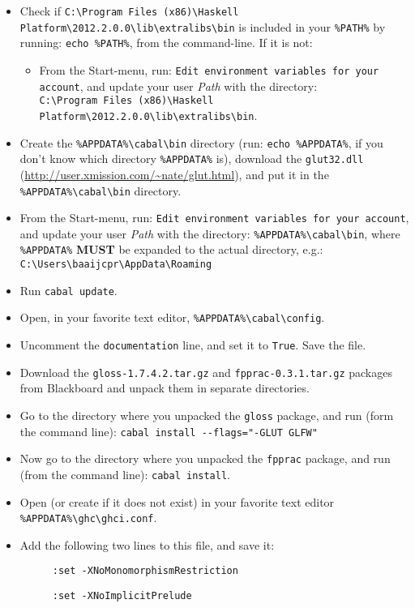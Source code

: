 \documentclass[]{article}
\begin{document}
\begin{itemize}
  \item Check if \texttt{C:\textbackslash{}Program Files (x86)\textbackslash{}Haskell Platform\textbackslash{}2012.2.0.0\textbackslash{}lib\textbackslash{}extralibs\textbackslash{}bin} is included in your \texttt{\%PATH\%} by running: \texttt{echo \%PATH\%}, from the command-line.
  If it is not:
  \begin{itemize}
    \item From the Start-menu, run: \texttt{Edit environment variables for your account}, and update your user \emph{Path} with the directory:\\ \texttt{C:\textbackslash{}Program Files (x86)\textbackslash{}Haskell Platform\textbackslash{}2012.2.0.0\textbackslash{}lib\textbackslash{}extralibs\textbackslash{}bin}.
  \end{itemize}
  \item Create the \texttt{\%APPDATA\%\textbackslash{}cabal\textbackslash{}bin} directory (run: \texttt{echo \%APPDATA\%}, if you don't know which directory \texttt{\%APPDATA\%} is), download the \texttt{glut32.dll} (\url{http://user.xmission.com/~nate/glut.html}), and put it in the \texttt{\%APPDATA\%\textbackslash{}cabal\textbackslash{}bin} directory.
  \item From the Start-menu, run: \texttt{Edit environment variables for your account}, and update your user \emph{Path} with the directory: \texttt{\%APPDATA\%\textbackslash{}cabal\textbackslash{}bin}, where \texttt{\%APPDATA\%} \textbf{MUST} be expanded to the actual directory, e.g.: \texttt{C:\textbackslash{}Users\textbackslash{}baaijcpr\textbackslash{}AppData\textbackslash{}Roaming}
  \item Run \texttt{cabal update}.
  \item Open, in your favorite text editor, \texttt{\%APPDATA\%\textbackslash{}cabal\textbackslash{}config}.
  \item Uncomment the \texttt{documentation} line, and set it to \texttt{True}. Save the file.
  \item Download the \texttt{gloss-1.7.4.2.tar.gz} and \texttt{fpprac-0.3.1.tar.gz} packages from Blackboard and unpack them in separate directories.
  \item Go to the directory where you unpacked the \texttt{gloss} package, and run (form the command line): \texttt{cabal install -{}-flags="-GLUT GLFW"}
  \item Now go to the directory where you unpacked the \texttt{fpprac} package, and run (from the command line): \texttt{cabal install}.
  \item Open (or create if it does not exist) in your favorite text editor \texttt{\%APPDATA\%\textbackslash{}ghc\textbackslash{}ghci.conf}.
  \item Add the following two lines to this file, and save it:
  \begin{description}
    \item[] \texttt{:set -XNoMonomorphismRestriction}
    \item[] \texttt{:set -XNoImplicitPrelude}
  \end{description}
\end{itemize}
\end{document}

